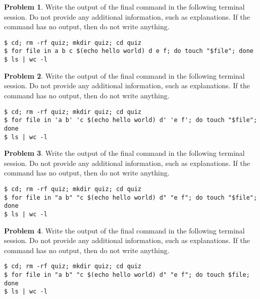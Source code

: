 \documentclass[10pt]{article}
\theoremstyle{definition}
\newtheorem{problem}{Problem}
\begin{document}
\begin{samepage}
\begin{problem}
Write the output of the final command in the following terminal session.
Do not provide any additional information,
such as explanations.
If the command has no output,
then do not write anything.

\end{problem}
\begin{lstlisting}
$ cd; rm -rf quiz; mkdir quiz; cd quiz
$ for file in a b c $(echo hello world) d e f; do touch "$file"; done
$ ls | wc -l
\end{lstlisting}
\end{samepage}


\begin{samepage}
\begin{problem}
Write the output of the final command in the following terminal session.
Do not provide any additional information,
such as explanations.
If the command has no output,
then do not write anything.

\end{problem}
\begin{lstlisting}
$ cd; rm -rf quiz; mkdir quiz; cd quiz
$ for file in 'a b' 'c $(echo hello world) d' 'e f'; do touch "$file"; done
$ ls | wc -l
\end{lstlisting}
\end{samepage}


\begin{samepage}
\begin{problem}
Write the output of the final command in the following terminal session.
Do not provide any additional information,
such as explanations.
If the command has no output,
then do not write anything.

\end{problem}
\begin{lstlisting}
$ cd; rm -rf quiz; mkdir quiz; cd quiz
$ for file in "a b" "c $(echo hello world) d" "e f"; do touch "$file"; done
$ ls | wc -l
\end{lstlisting}
\end{samepage}


\begin{samepage}
\begin{problem}
Write the output of the final command in the following terminal session.
Do not provide any additional information,
such as explanations.
If the command has no output,
then do not write anything.

\end{problem}
\begin{lstlisting}
$ cd; rm -rf quiz; mkdir quiz; cd quiz
$ for file in "a b" "c $(echo hello world) d" "e f"; do touch $file; done
$ ls | wc -l
\end{lstlisting}
\end{samepage}
\end{document}
